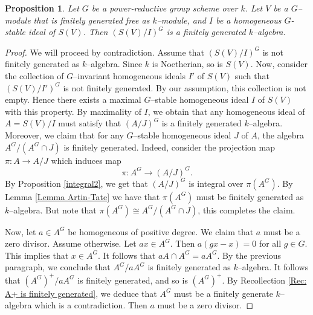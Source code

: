 \documentclass{article}
\theoremstyle{plain}
\newtheorem{Prop}[Th]{Proposition}
\theoremstyle{definition}
\begin{document}
\begin{Prop}\label{Prop: I is homogeneous}
    Let $G$ be a power-reductive group scheme over $k$. Let $V$ be  a  $G$--module that is finitely generated free as $k$--module, and $I$ be a homogeneous $G$-stable ideal of $S(V)$. Then $(S(V)/I)^G$ is a finitely generated $k$--algebra. 
\end{Prop}

\begin{proof}
    We will proceed by contradiction. Assume that $(S(V)/I)^G$ is not finitely generated as $k$--algebra. Since $k$ is Noetherian, so is $S(V)$. Now, consider the collection of $G$--invariant homogeneous ideals $I'$ of $S(V)$ such that $(S(V)/I')^G$ is not finitely generated. By our assumption, this collection is not empty. Hence there exists a maximal $G$--stable homogeneous ideal $I$ of $S(V)$ with this property. By maximality of $I$, we obtain that any homogeneous ideal of $A=S(V)/I$ must satisfy that $(A/J)^G$ is a finitely generated $k$--algebra. Moreover, we claim that for any $G$--stable homogeneous ideal $J$ of $A$, the algebra $A^G/(A^G\cap J)$ is finitely generated.  Indeed, consider the  projection map $\pi\colon A\to A/J$ which induces  map 
    \[ \pi\colon A^G\to (A/J)^G. \]
    By Proposition \ref{integral2}, we get that $(A/J)^G$ is integral over $\pi (A^G)$. By Lemma \ref{Lemma Artin-Tate} we have that $\pi(A^G)$ must be finitely generated as $k$--algebra. But note that $\pi(A^G)\cong A^G/(A^G\cap J)$, this completes the claim.

    Now, let $a\in A^G$ be homogeneous of positive degree. We claim that $a$ must be a zero divisor. Assume otherwise. Let $ax\in A^G$. Then $a(gx-x)=0$ for all $g\in G$. This implies that $x\in A^G$. It follows that $a A\cap A^G =a A^G$. By the previous paragraph,  we conclude that $A^G/aA^G$ is finitely generated as $k$--algebra. It follows that $(A^G)^+/aA^G$ is finitely generated, and so is $(A^G)^+$. By Recollection \ref{Rec: A+ is finitely generated}, we deduce that $A^G$ must be a finitely generate $k$--algebra which is a contradiction.  Then $a$ must be a zero divisor. 


\end{proof}
\end{document}
